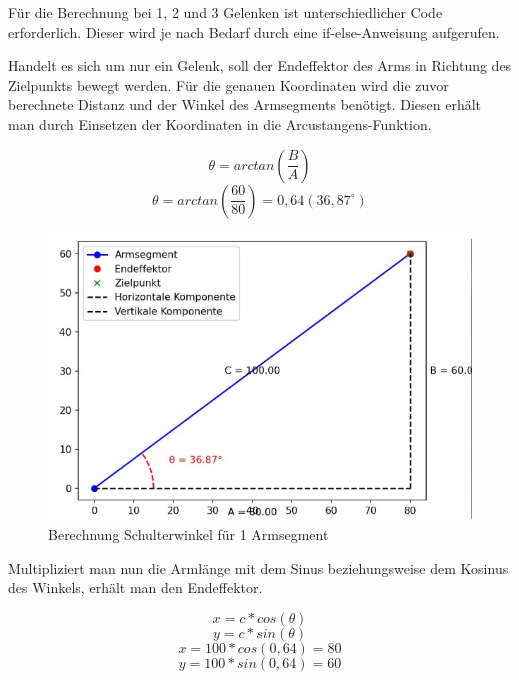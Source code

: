 \documentclass[12pt]{article}
\begin{document}
    


    Für die Berechnung bei 1, 2 und 3 Gelenken ist unterschiedlicher Code erforderlich. Dieser wird je
    nach Bedarf durch eine if-else-Anweisung aufgerufen.

    Handelt es sich um nur ein Gelenk, soll der Endeffektor des Arms in Richtung des Zielpunkts
    bewegt werden. Für die genauen Koordinaten wird die zuvor berechnete Distanz und der Winkel des
    Armsegments benötigt. Diesen erhält man durch Einsetzen der Koordinaten in die
    Arcustangens-Funktion.

    \[
        \theta=arctan(\frac{B}{A})
    \]
    \[
        \theta=arctan(\frac{60}{80})=0,64 (36,87^\circ)
    \]

    \begin{figure}[h]
        \centering
        \includegraphics[width = \linewidth]{Bild 2}
        \caption{Berechnung Schulterwinkel für 1 Armsegment}
    \end{figure}

    

    Multipliziert man nun die Armlänge mit dem Sinus beziehungsweise dem Kosinus des Winkels, erhält
    man den Endeffektor.

    \[
        x=c * cos(\theta)
    \]
    \[
        y=c * sin(\theta)
    \]
    \[
        x=100 * cos(0,64)=80
    \]
    \[
        y=100 * sin(0,64)=60
    \]

    
\end{document}

